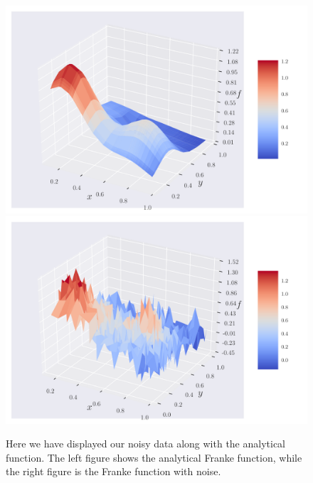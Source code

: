 \documentclass[reprint,english,notitlepage,aps,nobalancelastpage,nofootinbib]{revtex4-1}  %
\begin{document}
\begin{figure}[!htb]
	\includegraphics[width=\linewidth]{Frank_anal_eps_0.pdf}
	\endminipage\hfill
	\includegraphics[width=\linewidth]{Franke_rawdata_eps02.pdf}
	\endminipage
	\caption{Here we have displayed our noisy data along with the analytical function. The left figure shows the analytical Franke function, while the right figure is the Franke function with noise.}\label{fig:FF_dataset}
\end{figure}
\end{document}
